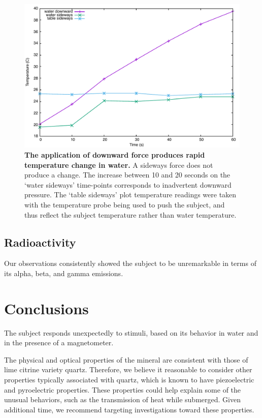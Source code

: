 \documentclass[10pt]{article}
\begin{document}
\begin{figure}
\includegraphics[width=1.0\textwidth]{01-temp.pdf}
\caption{\label{fig:temperature}\textbf{The application of downward force produces rapid temperature change in water.} A sideways force does not produce a change. The increase between 10 and 20 seconds on the `water sideways' time-points corresponds to inadvertent downward pressure. The `table sideways' plot temperature readings were taken with the temperature probe being used to push the subject, and thus reflect the subject temperature rather than water temperature.}
\end{figure}

\subsection{Radioactivity}
Our observations consistently showed the subject to be unremarkable in terms of its alpha, beta, and gamma emissions.

\section{Conclusions}\label{conclusions}
The subject responds unexpectedly to stimuli, based on its behavior in water and in the presence of a magnetometer.

The physical and optical properties of the mineral are consistent with those of lime citrine variety quartz.
Therefore, we believe it reasonable to consider other properties typically associated with quartz, which is known to have piezoelectric and pyroelectric properties.
These properties could help explain some of the unusual behaviors, such as the transmission of heat while submerged.
Given additional time, we recommend targeting investigations toward these properties.
 
\end{document}
